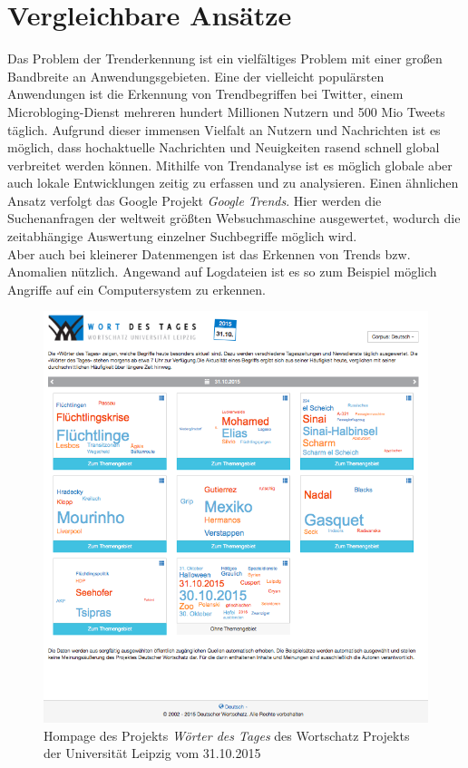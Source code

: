 \section{Vergleichbare Ansätze}
Das Problem der Trenderkennung ist ein vielfältiges Problem mit einer großen Bandbreite an Anwendungsgebieten. Eine der vielleicht populärsten Anwendungen ist die Erkennung von Trendbegriffen bei Twitter, einem Microbloging-Dienst mehreren hundert Millionen Nutzern und 500 Mio Tweets täglich. Aufgrund dieser immensen Vielfalt an Nutzern und Nachrichten ist es möglich, dass hochaktuelle Nachrichten und Neuigkeiten rasend schnell global verbreitet werden können. Mithilfe von Trendanalyse ist es möglich globale aber auch lokale Entwicklungen zeitig zu erfassen und zu analysieren.
Einen ähnlichen Ansatz verfolgt das Google Projekt \emph{Google Trends}. Hier werden die Suchenanfragen der weltweit größten Websuchmaschine ausgewertet, wodurch die zeitabhängige Auswertung einzelner Suchbegriffe möglich wird. \\
Aber auch bei kleinerer Datenmengen ist das Erkennen von Trends bzw. Anomalien nützlich. Angewand auf Logdateien ist es so zum Beispiel möglich Angriffe auf ein Computersystem zu erkennen. \cite{Zwietasch14}

\begin{figure}[h!]
    \centering
    \includegraphics[width=1\textwidth]{pictures/wdt_homepage.png}
    \caption{Hompage des Projekts \emph{Wörter des Tages} des Wortschatz Projekts der Universität Leipzig vom 31.10.2015}\label{pic.homepage}
\end{figure}


